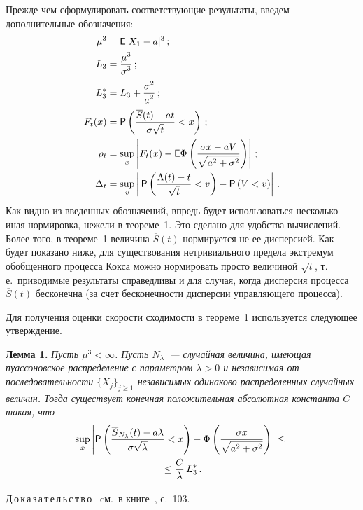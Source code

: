 \begin{multicols}{2}
Прежде чем сформулировать соответствующие результаты, введем
дополнительные обозначения:
\begin{align*}
\mu^3 &= {\sf E}|X_1-a|^3\,;\\
L_3 &= \displaystyle\frac{\displaystyle \mu^3\mathstrut}{\displaystyle \sigma^3\mathstrut}\,;\\
L_3^{*} & = L_3+\displaystyle\frac{\displaystyle \sigma^2\mathstrut}{\displaystyle a^2\mathstrut}\,;\\
F_t(x) &= {\sf P}\left(\displaystyle\frac{\displaystyle \overline{S}(t)-at\mathstrut}{\displaystyle \sigma\sqrt{t}\mathstrut}<
x\right)\,;
\\
\rho_t &=\sup_x \left|F_t(x) - {\sf E} \Phi\left(\displaystyle\frac{\displaystyle \sigma x -
aV\mathstrut}{\displaystyle {\sqrt{a^2 + \sigma^2}}\mathstrut}\right) \right|\,;\\
\Delta_t &=
\sup_{v}\left|\,{\sf P}\left(\displaystyle\frac{\displaystyle \Lambda(t)-t\mathstrut}{\displaystyle \sqrt{t}\mathstrut}<v\right)-{\sf P}
\left(V <v\right)\right|\,.
\end{align*}
Как видно из введенных обозначений, впредь будет использоваться
несколько иная нормировка, нежели в теореме~1. Это сделано для
удобства вычислений. Более того, в теореме~1 величина
$\overline{S}(t)$ нормируется не ее дисперсией. Как будет показано
ниже, для существования нетривиального предела экстремум
обобщенного процесса Кокса можно нормировать просто величиной
$\sqrt{t}$, т.\,е.\ приводимые результаты справедливы и для
случая, когда дисперсия процесса $\overline{S}(t)$ бесконечна (за
счет бесконечности дисперсии управляющего процесса).

Для получения оценки скорости сходимости в теореме~1 используется
следующее утверждение.

\smallskip

\noindent
\textbf{Лемма 1.} {\it Пусть $\mu^3 < \infty$. Пусть $N_\lambda$~---
случайная величина, имеющая пуассоновское распределение с
параметром $\lambda>0$ и независимая от по\-сле\-до\-ва\-тель\-ности
$\{X_j\}_{j\geq 1}$ независимых одинаково распределенных случайных
величин. Тогда существует конечная положительная абсолютная
константа $C$ такая, что}
\begin{multline*}
\sup_x \left|{\sf P}\left(\displaystyle\frac{\displaystyle \overline{S}_{N_\lambda}(t) -a\lambda\mathstrut}{\displaystyle {\sigma\sqrt{\lambda}}\mathstrut} < x\right)
- \Phi\left(\displaystyle\frac{\displaystyle \sigma x \mathstrut}{\displaystyle {\sqrt{a^2 + \sigma^2}}\mathstrut}\right) \right|
\leq{}\\
{}\leq  \displaystyle\frac{\displaystyle C\mathstrut}{\displaystyle {\lambda}\mathstrut}\,L_3^*\,.
\end{multline*}

\smallskip

Д\,о\,к\,а\,з\,а\,т\,е\,л\,ь\,с\,т\,в\,о \ cм.\ в книге~\cite{1a}, с.~103.

\smallskip


\end{multicols}
